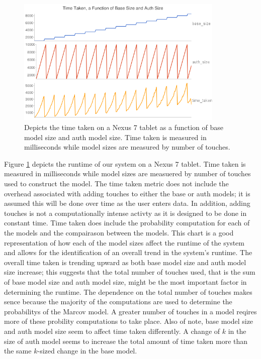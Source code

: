 \documentclass{acm_proc_article-sp}
\begin{document}
\begin{figure}
\centering
\includegraphics[width=3.9in]{nexus_speed_test.png}
\caption{Depicts the time taken on a Nexus 7 tablet as a function of base model size and auth model size. Time taken is measured in milliseconds while model sizes are measured by number of touches.}
\label{fig:nexus_speed_test}
\end{figure}

Figure \ref{fig:nexus_speed_test} depicts the runtime of our system on a Nexus 7 tablet. Time taken is measured in milliseconds while model sizes are measuered by number of touches used to construct the model. 
The time taken metric does not include the overhead associated with adding touches to either the base or auth models; it is assumed this will be done over time as the user enters data. In addition, adding touches is not a computationally intense activty as it is designed to be done in constant time. 
Time taken does include the probability computation for each of the models and the compairason between the models.
This chart is a good representation of how each of the model sizes affect the runtime of the system and allows for the identification of an overall trend in the system's runtime. The overall time taken is trending upward as both base model size and auth model size increase; this suggests that the total number of touches used, that is the sum of base model size and auth model size, might be the most important factor in determining the runtime.
The dependence on the total number of touches makes sence because the majority of the computations are used to determine the probabilitys of the Marcov model. A greater number of touches in a model reqires more of these probility computations to take place.
Also of note, base model size and auth model size seem to affect time taken differently. A change of $k$ in the size of auth model seems to increase the total amount of time taken more than the same $k$-sized change in the base model. 
\end{document}
